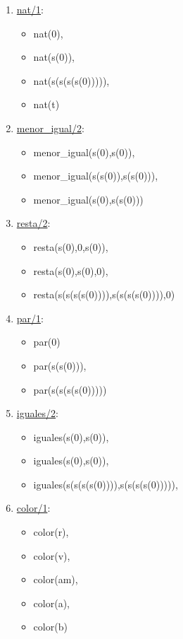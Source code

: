 \documentclass{article}
\begin{document}
\begin{enumerate}
	\item \underline{nat/1}:
	\begin{itemize}
	\item nat(0),            
	\item nat(s(0)),
	\item nat(s(s(s(s(0))))),
	\item nat(t)
	\end{itemize}
	
	\item \underline{menor\_igual/2}:
	\begin{itemize}
	\item menor\_igual(s(0),s(0)),             
	\item menor\_igual(s(s(0)),s(s(0))),
	\item menor\_igual(s(0),s(s(0)))
	\end{itemize}

\item \underline{resta/2}:
\begin{itemize}
	\item resta(s(0),0,s(0)),            
	\item resta(s(0),s(0),0),             
	\item resta(s(s(s(s(0)))),s(s(s(s(0)))),0)
\end{itemize}

\item \underline{par/1}:
\begin{itemize}
	\item par(0)             
	\item par(s(s(0))),             
	\item par(s(s(s(s(0)))))
\end{itemize}

\item \underline{iguales/2}:
\begin{itemize}
	\item iguales(s(0),s(0)),             
	\item iguales(s(0),s(0)),             
	\item iguales(s(s(s(s(0)))),s(s(s(s(0))))),
\end{itemize}

\item \underline{color/1}:
\begin{itemize}
	\item color(r),             
	\item color(v),             
	\item color(am),
	\item color(a),
	\item color(b)
\end{itemize}


\end{enumerate}
\end{document}
